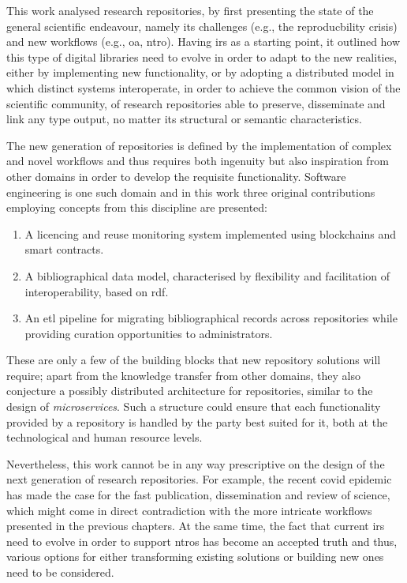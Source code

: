 This work analysed research repositories, by first presenting the state of the general scientific endeavour, namely its challenges (e.g., the reproducbility crisis) and new workflows (e.g., \gls{oa}, \gls{ntro}). Having \glspl{ir} as a starting point, it outlined how this type of digital libraries need to evolve in order to adapt to the new realities, either by implementing new functionality, or by adopting a distributed model in which distinct systems interoperate, in order to achieve the common vision of the scientific community, of research repositories able to preserve, disseminate and link any type  output, no matter its structural or semantic characteristics.

The new generation of repositories is defined by the implementation of complex and novel workflows and thus requires both ingenuity but also inspiration from other domains in order to develop the requisite functionality. Software engineering is one such domain and in this work three original contributions employing concepts from this discipline are presented:
\begin{enumerate}
    \item A licencing and reuse monitoring system implemented using blockchains and smart contracts.
    \item A bibliographical data model, characterised by flexibility and facilitation of interoperability, based on \gls{rdf}.
    \item An \gls{etl} pipeline for migrating bibliographical records across repositories while providing curation opportunities to administrators.
\end{enumerate}

These are only a few of the building blocks that new repository solutions will require; apart from the knowledge transfer from other domains, they also conjecture a possibly distributed architecture for repositories, similar to the design of \emph{microservices}. Such a structure could ensure that each functionality provided by a repository is handled by the party best suited for it, both at the technological and human resource levels.

Nevertheless, this work cannot be in any way prescriptive on the design of the next generation of research repositories. For example, the recent \gls{covid} epidemic has made the case for the fast publication, dissemination and review of science\cite{cochran}, which might come in direct contradiction with the more intricate workflows presented in the previous chapters. At the same time, the fact that current \glspl{ir} need to evolve in order to support \glspl{ntro} has become an accepted truth and thus, various options for either transforming existing solutions or building new ones need to be considered.

